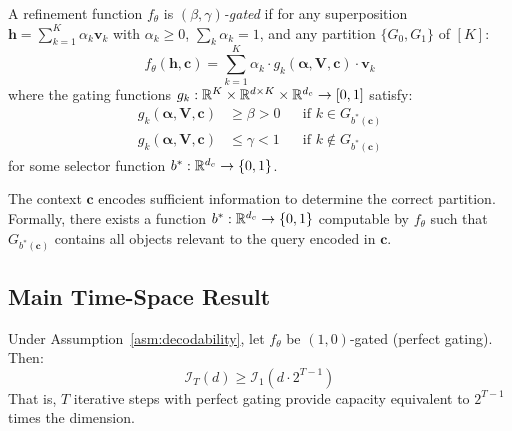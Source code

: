 \begin{definition}
\label{def:gating}
A refinement function $f_\theta$ is \emph{$(\beta, \gamma)$-gated} if for any superposition $\mathbf{h} = \sum_{k=1}^K \alpha_k \mathbf{v}_k$ with $\alpha_k \geq 0$, $\sum_k \alpha_k = 1$, and any partition $\{G_0, G_1\}$ of $[K]$:
\begin{equation}
f_\theta(\mathbf{h}, \mathbf{c}) = \sum_{k=1}^K \alpha_k \cdot g_k(\boldsymbol{\alpha}, \mathbf{V}, \mathbf{c}) \cdot \mathbf{v}_k
\end{equation}
where the gating functions $g_k: \mathbb{R}^K \times \mathbb{R}^{d \times K} \times \mathbb{R}^{d_c} \to [0, 1]$ satisfy:
\begin{align}
g_k(\boldsymbol{\alpha}, \mathbf{V}, \mathbf{c}) &\geq \beta > 0 && \text{if } k \in G_{b^*(\mathbf{c})} \label{eq:gate_preserve}\\
g_k(\boldsymbol{\alpha}, \mathbf{V}, \mathbf{c}) &\leq \gamma < 1 && \text{if } k \notin G_{b^*(\mathbf{c})} \label{eq:gate_suppress}
\end{align}
for some selector function $b^*: \mathbb{R}^{d_c} \to \{0, 1\}$.
\end{definition}

\begin{assumption}[Decodability]
\label{asm:decodability}
The context $\mathbf{c}$ encodes sufficient information to determine the correct partition. Formally, there exists a function $b^*: \mathbb{R}^{d_c} \to \{0, 1\}$ computable by $f_\theta$ such that $G_{b^*(\mathbf{c})}$ contains all objects relevant to the query encoded in $\mathbf{c}$.
\end{assumption}

\subsection{Main Time-Space Result}

\begin{theorem}
\label{thm:timespace}
Under Assumption~\ref{asm:decodability}, let $f_\theta$ be $(1, 0)$-gated (perfect gating). Then:
\begin{equation}
\mathcal{I}_T(d) \geq \mathcal{I}_1(d \cdot 2^{T-1})
\label{eq:timespace_main}
\end{equation}
That is, $T$ iterative steps with perfect gating provide capacity equivalent to $2^{T-1}$ times the dimension.
\end{theorem}

